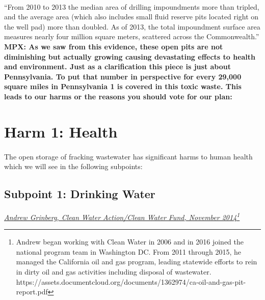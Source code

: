 \documentclass[11pt]{article}
\begin{document}
	\paragraph{}
	``From 2010 to 2013 the median area of drilling impoundments more than tripled, and the average area (which also includes small fluid reserve pits located right on the well pad) more than doubled. As of 2013, the total impoundment surface area measures nearly four million square meters, scattered across the Commonwealth.''\newline
	\textbf{MPX: As we saw from this evidence, these open pits are not diminishing but actually growing causing devastating effects to health and environment. Just as a clarification this piece is just about Pennsylvania.  To put that number in perspective for every 29,000 square miles in Pennsylvania 1 is covered in this toxic waste.  This leads to our harms or the reasons you should vote for our plan:}
	
	\section{Harm 1: Health}
	\paragraph{}
	The open storage of fracking wastewater has significant harms to human health which we will see in the following subpoints:
	\pagebreak
	
	\subsection{Subpoint 1: Drinking Water}
	\textit{\ul{Andrew Grinberg, Clean Water Action/Clean Water Fund, November 2014}\footnote{Andrew began working with Clean Water in 2006 and in 2016 joined the national program team in Washington DC. From 2011 through 2015, he managed the California oil and gas program, leading statewide efforts to rein in dirty oil and gas activities including disposal of wastewater. https://assets.documentcloud.org/documents/1362974/ca-oil-and-gas-pit-report.pdf}}
\end{document}
